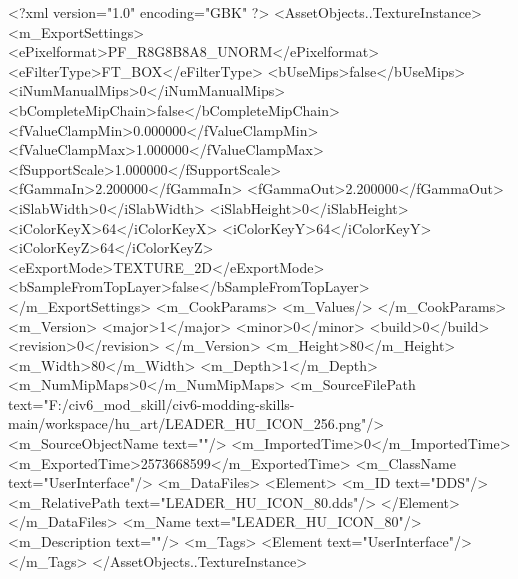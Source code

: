 <?xml version="1.0" encoding="GBK" ?>
<AssetObjects..TextureInstance>
	<m_ExportSettings>
		<ePixelformat>PF_R8G8B8A8_UNORM</ePixelformat>
		<eFilterType>FT_BOX</eFilterType>
		<bUseMips>false</bUseMips>
		<iNumManualMips>0</iNumManualMips>
		<bCompleteMipChain>false</bCompleteMipChain>
		<fValueClampMin>0.000000</fValueClampMin>
		<fValueClampMax>1.000000</fValueClampMax>
		<fSupportScale>1.000000</fSupportScale>
		<fGammaIn>2.200000</fGammaIn>
		<fGammaOut>2.200000</fGammaOut>
		<iSlabWidth>0</iSlabWidth>
		<iSlabHeight>0</iSlabHeight>
		<iColorKeyX>64</iColorKeyX>
		<iColorKeyY>64</iColorKeyY>
		<iColorKeyZ>64</iColorKeyZ>
		<eExportMode>TEXTURE_2D</eExportMode>
		<bSampleFromTopLayer>false</bSampleFromTopLayer>
	</m_ExportSettings>
	<m_CookParams>
		<m_Values/>
	</m_CookParams>
	<m_Version>
		<major>1</major>
		<minor>0</minor>
		<build>0</build>
		<revision>0</revision>
	</m_Version>
	<m_Height>80</m_Height>
	<m_Width>80</m_Width>
	<m_Depth>1</m_Depth>
	<m_NumMipMaps>0</m_NumMipMaps>
	<m_SourceFilePath text="F:/civ6_mod_skill/civ6-modding-skills-main/workspace/hu_art/LEADER_HU_ICON_256.png"/>
	<m_SourceObjectName text=""/>
	<m_ImportedTime>0</m_ImportedTime>
	<m_ExportedTime>2573668599</m_ExportedTime>
	<m_ClassName text="UserInterface"/>
	<m_DataFiles>
		<Element>
			<m_ID text="DDS"/>
			<m_RelativePath text="LEADER_HU_ICON_80.dds"/>
		</Element>
	</m_DataFiles>
	<m_Name text="LEADER_HU_ICON_80"/>
	<m_Description text=""/>
	<m_Tags>
		<Element text="UserInterface"/>
	</m_Tags>
</AssetObjects..TextureInstance>
